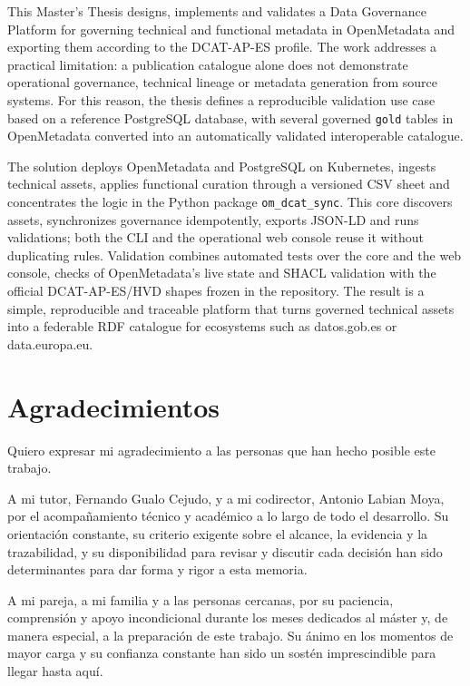 This Master's Thesis designs, implements and validates a Data Governance Platform for governing technical and functional metadata in OpenMetadata and exporting them according to the DCAT-AP-ES profile. The work addresses a practical limitation: a publication catalogue alone does not demonstrate operational governance, technical lineage or metadata generation from source systems. For this reason, the thesis defines a reproducible validation use case based on a reference PostgreSQL database, with several governed \texttt{gold} tables in OpenMetadata converted into an automatically validated interoperable catalogue.

The solution deploys OpenMetadata and PostgreSQL on Kubernetes, ingests technical assets, applies functional curation through a versioned CSV sheet and concentrates the logic in the Python package \texttt{om\_dcat\_sync}. This core discovers assets, synchronizes governance idempotently, exports JSON-LD and runs validations; both the CLI and the operational web console reuse it without duplicating rules. Validation combines automated tests over the core and the web console, checks of OpenMetadata's live state and SHACL validation with the official DCAT-AP-ES/HVD shapes frozen in the repository. The result is a simple, reproducible and traceable platform that turns governed technical assets into a federable RDF catalogue for ecosystems such as datos.gob.es or data.europa.eu.
\clearpage

\cleardoublepage
\thispagestyle{plain}
\chapter*{Agradecimientos}

Quiero expresar mi agradecimiento a las personas que han hecho posible este trabajo.

A mi tutor, Fernando Gualo Cejudo, y a mi codirector, Antonio Labian Moya, por el acompañamiento técnico y académico a lo largo de todo el desarrollo. Su orientación constante, su criterio exigente sobre el alcance, la evidencia y la trazabilidad, y su disponibilidad para revisar y discutir cada decisión han sido determinantes para dar forma y rigor a esta memoria. 

A mi pareja, a mi familia y a las personas cercanas, por su paciencia, comprensión y apoyo incondicional durante los meses dedicados al máster y, de manera especial, a la preparación de este trabajo. Su ánimo en los momentos de mayor carga y su confianza constante han sido un sostén imprescindible para llegar hasta aquí.
\clearpage
